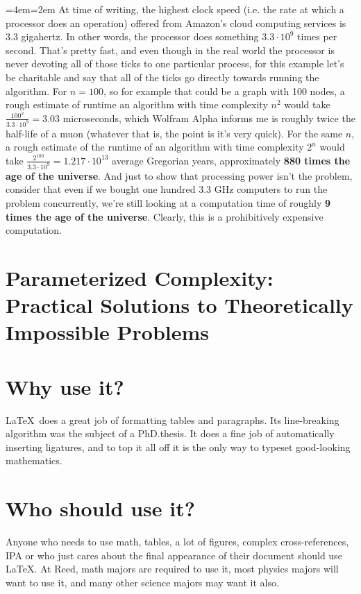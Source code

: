 \documentclass[12pt,twoside]{reedthesis}
\newenvironment{blockquote}{%
  \par%
  \medskip
  \leftskip=4em\rightskip=2em%
  \noindent\ignorespaces}{%
  \par\medskip}
\begin{document}
\begin{blockquote}
At time of writing, the highest clock speed (i.e. the rate at which a processor does an operation) offered from Amazon's cloud computing services is 3.3 gigahertz. In other words, the processor does something $3.3 \cdot 10^9$ times per second. That's pretty fast, and even though in the real world the processor is never devoting all of those ticks to one particular process, for this example let's be charitable and say that all of the ticks go directly towards running the algorithm. For $n = 100$, so for example that could be a graph with 100 nodes, a rough estimate of runtime an algorithm with time complexity $n^2$ would take $\frac{100^2}{3.3 \cdot 10^9} = 3.03$ microseconds, which Wolfram Alpha informs me is roughly twice the half-life of a muon (whatever that is, the point is it's very quick). For the same $n$, a rough estimate of the runtime of an algorithm with time complexity $2^n$ would take $\frac{2^{100}}{3.3 \cdot 10^9} = 1.217 \cdot 10^{13}$ average Gregorian years, approximately \textbf{880 times the age of the universe}. And just to show that processing power isn't the problem, consider that even if we bought one hundred 3.3 GHz computers to run the problem concurrently, we're still looking at a computation time of roughly \textbf{9 times the age of the universe}. Clearly, this is a prohibitively expensive computation.
\end{blockquote}

\section{Parameterized Complexity: Practical Solutions to Theoretically Impossible Problems}

\section{Why use it?}
	
\LaTeX\ does a great job of formatting tables and paragraphs. Its line-breaking algorithm was the subject of a PhD.\thinspace thesis. It does a fine job of automatically inserting ligatures, and to top it all off it is the only way to typeset good-looking mathematics.

\section{Who should use it?}

Anyone who needs to use math, tables, a lot of figures, complex cross-references, IPA or who just cares about the final appearance of their document should use \LaTeX. At Reed, math majors are required to use it, most physics majors will want to use it, and many other science majors may want it also.
	
\end{document}
